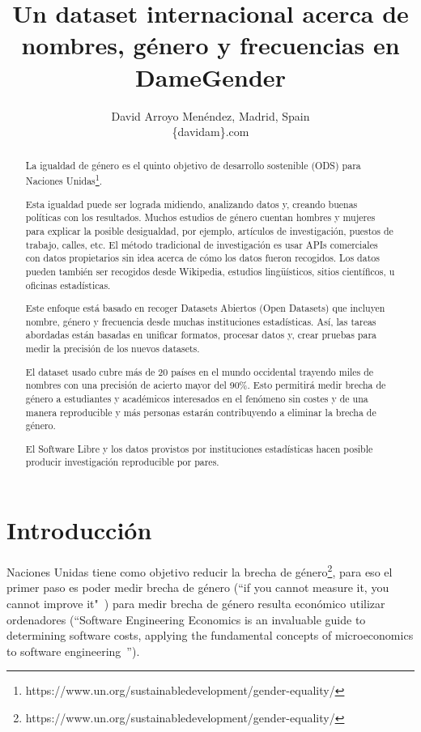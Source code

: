 \documentclass[a4paper]{article}
\title{Un dataset internacional acerca de nombres, género y frecuencias en DameGender}
\author{
David Arroyo Menéndez, Madrid, Spain \\ \{davidam\@gmail\}.com
}
\begin{document}
\maketitle

\begin{abstract}

  La igualdad de género es el quinto objetivo de desarrollo sostenible
  (ODS) para Naciones Unidas\footnote{https://www.un.org/sustainabledevelopment/gender-equality/}.

  Esta igualdad puede ser lograda midiendo, analizando datos y,
  creando buenas políticas con los resultados. Muchos estudios
  de género cuentan hombres y mujeres para explicar la posible
  desigualdad, por ejemplo, artículos de investigación, puestos
  de trabajo, calles, etc. El método tradicional de investigación
  es usar APIs comerciales con datos propietarios sin idea acerca
  de cómo los datos fueron recogidos. Los datos pueden también
  ser recogidos desde Wikipedia, estudios lingüísticos, sitios
  científicos, u oficinas estadísticas.


  Este enfoque está basado en recoger Datasets Abiertos (Open
  Datasets) que incluyen nombre, género y frecuencia desde
  muchas instituciones estadísticas. Así, las tareas abordadas
  están basadas en unificar formatos, procesar datos y, crear
  pruebas para medir la precisión de los nuevos datasets. 



  El dataset usado cubre más de 20 países en el mundo occidental
  trayendo miles de nombres con una precisión de acierto mayor del
  90\%. Esto permitirá medir brecha de género a estudiantes y
  académicos interesados en el fenómeno sin costes y de una manera
  reproducible y más personas estarán contribuyendo a eliminar la
  brecha de género.


  El Software Libre y los datos provistos por instituciones estadísticas
  hacen posible producir investigación reproducible por pares.
  
\end{abstract}

\section{Introducción}
Naciones Unidas tiene como objetivo reducir la brecha de
género\footnote{https://www.un.org/sustainabledevelopment/gender-equality/},
para eso el primer paso es poder medir brecha de género
(``if you cannot measure it, you cannot improve it"~\cite{thompson1833electrical})
para medir brecha de género resulta económico utilizar ordenadores
(``Software Engineering Economics is an invaluable guide to determining
software costs, applying the fundamental concepts of microeconomics
to software engineering~\cite{barry1981software}'').
\end{document}
